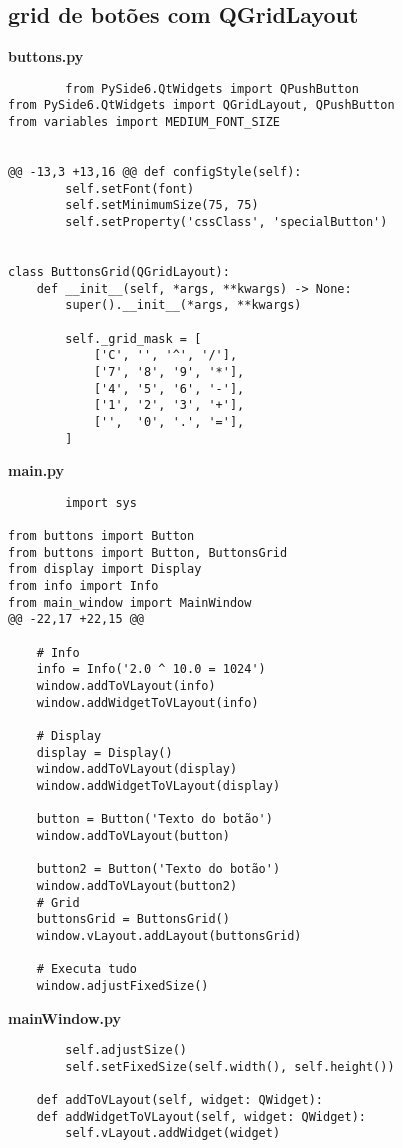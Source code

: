 \documentclass[12pt,a4paper]{article}
\begin{document}
    \subsection{grid de botões com QGridLayout}
    \textbf{buttons.py}
    \begin{lstlisting}
        from PySide6.QtWidgets import QPushButton
from PySide6.QtWidgets import QGridLayout, QPushButton
from variables import MEDIUM_FONT_SIZE


@@ -13,3 +13,16 @@ def configStyle(self):
        self.setFont(font)
        self.setMinimumSize(75, 75)
        self.setProperty('cssClass', 'specialButton')


class ButtonsGrid(QGridLayout):
    def __init__(self, *args, **kwargs) -> None:
        super().__init__(*args, **kwargs)

        self._grid_mask = [
            ['C', '', '^', '/'],
            ['7', '8', '9', '*'],
            ['4', '5', '6', '-'],
            ['1', '2', '3', '+'],
            ['',  '0', '.', '='],
        ]
    \end{lstlisting}

    \textbf{main.py}
    \begin{lstlisting}
        import sys

from buttons import Button
from buttons import Button, ButtonsGrid
from display import Display
from info import Info
from main_window import MainWindow
@@ -22,17 +22,15 @@

    # Info
    info = Info('2.0 ^ 10.0 = 1024')
    window.addToVLayout(info)
    window.addWidgetToVLayout(info)

    # Display
    display = Display()
    window.addToVLayout(display)
    window.addWidgetToVLayout(display)

    button = Button('Texto do botão')
    window.addToVLayout(button)

    button2 = Button('Texto do botão')
    window.addToVLayout(button2)
    # Grid
    buttonsGrid = ButtonsGrid()
    window.vLayout.addLayout(buttonsGrid)

    # Executa tudo
    window.adjustFixedSize()
    \end{lstlisting}
    \textbf{mainWindow.py}
    \begin{lstlisting}
        self.adjustSize()
        self.setFixedSize(self.width(), self.height())

    def addToVLayout(self, widget: QWidget):
    def addWidgetToVLayout(self, widget: QWidget):
        self.vLayout.addWidget(widget)
    \end{lstlisting}
\end{document}
